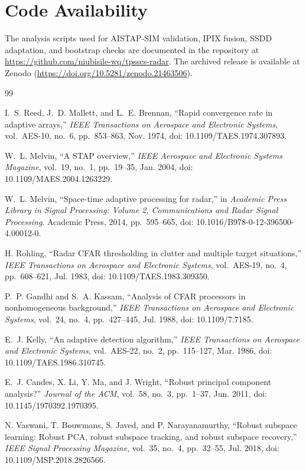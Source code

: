\documentclass[journal]{IEEEtran}
\begin{document}
\section*{Code Availability}

The analysis scripts used for AISTAP-SIM validation, IPIX fusion, SSDD adaptation, and bootstrap checks are documented in the repository at \url{https://github.com/niubisile-wq/tpsscs-radar}. The archived release is available at Zenodo (\url{https://doi.org/10.5281/zenodo.21463506}).
\begingroup
\fontsize{7.5}{8.5}\selectfont
\begin{thebibliography}{99}

I.~S. Reed, J.~D. Mallett, and L.~E. Brennan, ``Rapid convergence rate in adaptive arrays,'' \emph{IEEE Transactions on Aerospace and Electronic Systems}, vol.~AES-10, no.~6, pp.~853--863, Nov. 1974, doi: 10.1109/TAES.1974.307893.

W.~L. Melvin, ``A STAP overview,'' \emph{IEEE Aerospace and Electronic Systems Magazine}, vol.~19, no.~1, pp.~19--35, Jan. 2004, doi: 10.1109/MAES.2004.1263229.

W.~L. Melvin, ``Space-time adaptive processing for radar,'' in \emph{Academic Press Library in Signal Processing: Volume 2, Communications and Radar Signal Processing}. Academic Press, 2014, pp.~595--665, doi: 10.1016/B978-0-12-396500-4.00012-0.

H. Rohling, ``Radar CFAR thresholding in clutter and multiple target situations,'' \emph{IEEE Transactions on Aerospace and Electronic Systems}, vol.~AES-19, no.~4, pp.~608--621, Jul. 1983, doi: 10.1109/TAES.1983.309350.

P.~P. Gandhi and S.~A. Kassam, ``Analysis of CFAR processors in nonhomogeneous background,'' \emph{IEEE Transactions on Aerospace and Electronic Systems}, vol.~24, no.~4, pp.~427--445, Jul. 1988, doi: 10.1109/7.7185.

E.~J. Kelly, ``An adaptive detection algorithm,'' \emph{IEEE Transactions on Aerospace and Electronic Systems}, vol.~AES-22, no.~2, pp.~115--127, Mar. 1986, doi: 10.1109/TAES.1986.310745.

E.~J. Candes, X. Li, Y. Ma, and J. Wright, ``Robust principal component analysis?'' \emph{Journal of the ACM}, vol.~58, no.~3, pp.~1--37, Jun. 2011, doi: 10.1145/1970392.1970395.

N. Vaswani, T. Bouwmans, S. Javed, and P. Narayanamurthy, ``Robust subspace learning: Robust PCA, robust subspace tracking, and robust subspace recovery,'' \emph{IEEE Signal Processing Magazine}, vol.~35, no.~4, pp.~32--55, Jul. 2018, doi: 10.1109/MSP.2018.2826566.


\end{thebibliography}
\end{document}
